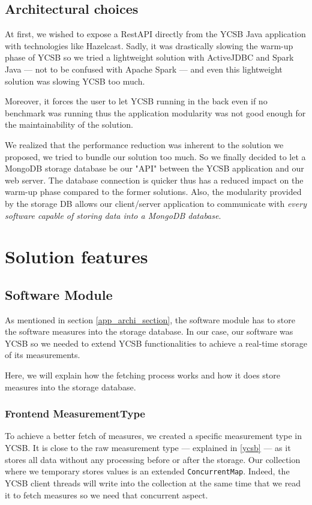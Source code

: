 \documentclass[a4paper,11pt]{report}
\begin{document}
\subsection{Architectural choices}

At first, we wished to expose a RestAPI directly from the YCSB Java application with technologies like Hazelcast. Sadly, it was drastically slowing the warm-up phase of YCSB so we tried a lightweight solution with ActiveJDBC and Spark Java --- not to be confused with Apache Spark --- and even this lightweight solution was slowing YCSB too much. 

Moreover, it forces the user to let YCSB running in the back even if no benchmark was running thus the application modularity was not good enough for the maintainability of the solution. 

We realized that the performance reduction was inherent to the solution we proposed, we tried to bundle our solution too much. So we finally decided to let a MongoDB storage database be our "API" between the YCSB application and our web server. The database connection is quicker thus has a reduced impact on the warm-up phase compared to the former solutions. Also, the modularity provided by the storage DB allows our client/server application to communicate with \textit{every software capable of storing data into a MongoDB database}.

\section{Solution features}\label{technical_description}

\subsection{Software Module}

As mentioned in section \ref{app_archi_section}, the software module has to store the software measures into the storage database. In our case, our software was YCSB so we needed to extend YCSB functionalities to achieve a real-time storage of its measurements. 

Here, we will explain how the fetching process works and how it does store measures into the storage database.

\subsubsection{Frontend MeasurementType}\label{concurrent_map_explainations} To achieve a better fetch of measures, we created a specific measurement type in YCSB. It is close to the raw measurement type --- explained in \ref{ycsb} --- as it stores all data without any processing before or after the storage. Our collection where we temporary stores values is an extended \texttt{ConcurrentMap}. Indeed, the YCSB client threads will write into the collection at the same time that we read it to fetch measures so we need that concurrent aspect.
\end{document}
